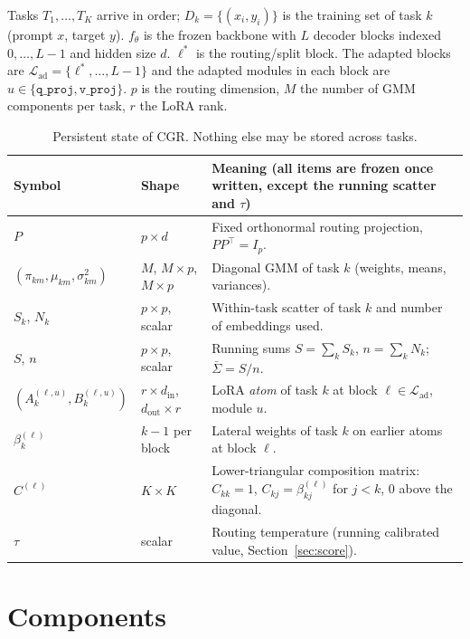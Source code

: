 \documentclass[11pt]{article}
\newcommand{\T}{^{\top}}
\newcommand{\Ladapt}{\mathcal{L}_{\mathrm{ad}}}
\begin{document}
Tasks $T_1,\dots,T_K$ arrive in order; $D_k=\{(x_i,y_i)\}$ is the training set of task $k$ (prompt $x$, target $y$).
$f_\theta$ is the frozen backbone with $L$ decoder blocks indexed $0,\dots,L-1$ and hidden size $d$.
$\ell^*$ is the routing/split block. The adapted blocks are $\Ladapt=\{\ell^*,\dots,L-1\}$ and the adapted modules
in each block are $u\in\{\texttt{q\_proj},\texttt{v\_proj}\}$. $p$ is the routing dimension, $M$ the number of
GMM components per task, $r$ the LoRA rank.

\begin{table}[h]
\centering
\small
\begin{tabularx}{\textwidth}{@{}l l X@{}}
\toprule
Symbol & Shape & Meaning (all items are frozen once written, except the running scatter and $\tau$)\\
\midrule
$P$ & $p\times d$ & Fixed orthonormal routing projection, $PP\T=I_p$.\\
$(\pi_{km},\mu_{km},\sigma^2_{km})$ & $M$, $M\times p$, $M\times p$ & Diagonal GMM of task $k$ (weights, means, variances).\\
$S_k$, $N_k$ & $p\times p$, scalar & Within-task scatter of task $k$ and number of embeddings used.\\
$S$, $n$ & $p\times p$, scalar & Running sums $S=\sum_k S_k$, $n=\sum_k N_k$; $\bar\Sigma=S/n$.\\
$(A_k^{(\ell,u)},B_k^{(\ell,u)})$ & $r\times d_{\mathrm{in}}$, $d_{\mathrm{out}}\times r$ & LoRA \emph{atom} of task $k$ at block $\ell\in\Ladapt$, module $u$.\\
$\beta_{k}^{(\ell)}$ & $k-1$ per block & Lateral weights of task $k$ on earlier atoms at block $\ell$.\\
$C^{(\ell)}$ & $K\times K$ & Lower-triangular composition matrix: $C_{kk}=1$, $C_{kj}=\beta^{(\ell)}_{kj}$ for $j<k$, $0$ above the diagonal.\\
$\tau$ & scalar & Routing temperature (running calibrated value, Section~\ref{sec:score}).\\
\bottomrule
\end{tabularx}
\caption{Persistent state of CGR. Nothing else may be stored across tasks.}
\end{table}

\section{Components}\label{sec:components}
\end{document}
